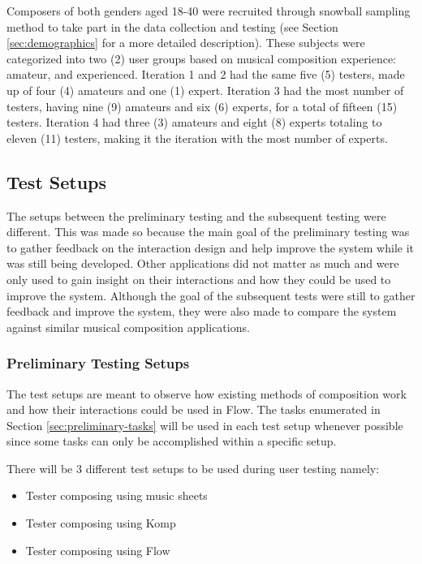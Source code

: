 		Composers of both genders aged 18-40 were recruited through snowball sampling method to take part in the data collection and testing (see Section \ref{sec:demographics} for a more detailed description). These subjects were categorized into two (2) user groups based on musical composition experience: amateur, and experienced. Iteration 1 and 2 had the same five (5) testers, made up of four (4) amateurs and one (1) expert. Iteration 3 had the most number of testers, having nine (9) amateurs and six (6) experts, for a total of fifteen (15) testers. Iteration 4 had three (3) amateurs and eight (8) experts totaling to eleven (11) testers, making it the iteration with the most number of experts. 

		\subsection{Test Setups}
		\label{sec:test-setups}

			The setups between the preliminary testing and the subsequent testing were different. This was made so because the main goal of the preliminary testing was to gather feedback on the interaction design and help improve the system while it was still being developed. Other applications did not matter as much and were only used to gain insight on their interactions and how they could be used to improve the system. Although the goal of the subsequent tests were still to gather feedback and improve the system, they were also made to compare the system against similar musical composition applications. 

			\subsubsection{Preliminary Testing Setups}

				The test setups are meant to observe how existing methods of composition work and how their interactions could be used in Flow. The tasks enumerated in Section \ref{sec:preliminary-tasks} will be used in each test setup whenever possible since some tasks can only be accomplished within a specific setup. 

				There will be 3 different test setups to be used during user testing namely:

				\begin{itemize}
					\item Tester composing using music sheets
					\item Tester composing using Komp
					\item Tester composing using Flow
				\end{itemize}

